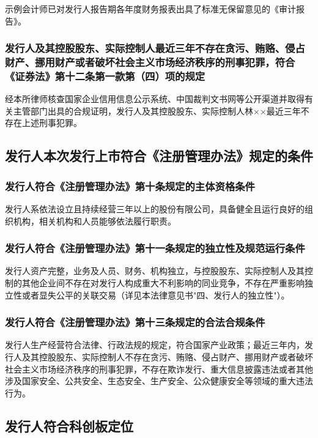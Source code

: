 \documentclass[zihao=-4]{ctexart}   %
\begin{document}
示例会计师已对发行人报告期各年度财务报表出具了标准无保留意见的《审计报告》。

\subsubsection{发行人及其控股股东、实际控制人最近三年不存在贪污、贿赂、侵占财产、挪用财产或者破坏社会主义市场经济秩序的刑事犯罪，符合《证券法》第十二条第一款第（四）项的规定}

经本所律师核查国家企业信用信息公示系统、中国裁判文书网等公开渠道并取得有
关主管部门出具的合规证明，发行人及其控股股东、实际控制人林××最近三年不
存在上述刑事犯罪。

\subsection{发行人本次发行上市符合《注册管理办法》规定的条件}

\subsubsection{发行人符合《注册管理办法》第十条规定的主体资格条件}

发行人系依法设立且持续经营三年以上的股份有限公司，具备健全且运行良好的组
织机构，相关机构和人员能够依法履行职责。

\subsubsection{发行人符合《注册管理办法》第十一条规定的独立性及规范运行条件}

发行人资产完整，业务及人员、财务、机构独立，与控股股东、实际控制人及其控
制的其他企业间不存在对发行人构成重大不利影响的同业竞争，不存在严重影响独
立性或者显失公平的关联交易（详见本法律意见书"四、发行人的独立性"）。

\subsubsection{发行人符合《注册管理办法》第十三条规定的合法合规条件}

发行人生产经营符合法律、行政法规的规定，符合国家产业政策；最近三年内，发
行人及其控股股东、实际控制人不存在贪污、贿赂、侵占财产、挪用财产或者破坏
社会主义市场经济秩序的刑事犯罪，不存在欺诈发行、重大信息披露违法或者其他
涉及国家安全、公共安全、生态安全、生产安全、公众健康安全等领域的重大违法
行为。

\subsection{发行人符合科创板定位}
\end{document}
